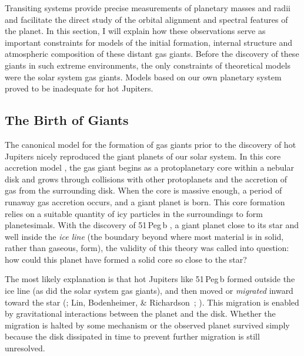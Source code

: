 Transiting systems provide precise measurements of planetary masses and radii and facilitate the direct study of the orbital alignment and spectral features of the planet. 
In this section, I will explain how these observations serve as important constraints for models of the initial formation, internal structure and atmospheric composition of these distant gas giants.
Before the discovery of these giants in such extreme environments, the only constraints of theoretical models were the solar system gas giants. 
Models based on our own planetary system proved to be inadequate for hot Jupiters.

\subsection{The Birth of Giants}
\label{cha:intro:sec:form:subsec:birth}

The canonical model for the formation of gas giants prior to the discovery of hot Jupiters nicely reproduced the giant planets of our solar system.
In this core accretion model \citep[see, e.g.,][]{Pollack:araa:1984a,Pollack_Hubickyj_Bodenheimer:icarus:1996a}, the gas giant begins as a protoplanetary core within a nebular disk and grows through collisions with other protoplanets and the accretion of gas from the surrounding disk.
When the core is massive enough, a period of runaway gas accretion occurs, and a giant planet is born. 
This core formation relies on a suitable quantity of icy particles in the surroundings to form planetesimals. 
With the discovery of \mbox{51\,Peg\,b} \citep{Mayor_Queloz:nat:1995a}, a giant planet close to its star and well inside the {\it ice line} (the boundary beyond where most material is in solid, rather than gaseous, form), the validity of this theory was called into question: how could this planet have formed a solid core so close to the star?

The most likely explanation is that hot Jupiters like \mbox{51\,Peg\,b} formed outside the ice line (as did the solar system gas giants), and then moved or {\it migrated} inward toward the star (\citealp{Goldreich_Tremaine:apj:1980a}; Lin, Bodenheimer, \& Richardson~\citeyear{Lin_Bodenheimer_Richardson:nat:1996a}; \citealp{Trilling_Benz_Guillot:apj:1998a}). 
This migration is enabled by gravitational interactions between the planet and the disk. 
Whether the migration is halted by some mechanism or the observed planet survived simply because the disk dissipated in time to prevent further migration is still unresolved.


